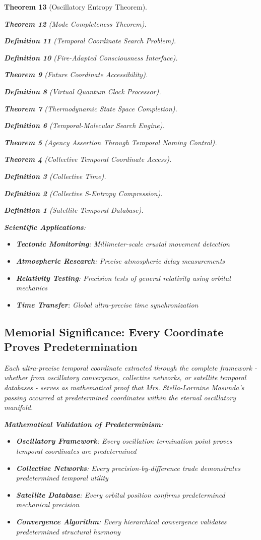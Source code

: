 \documentclass[12pt,a4paper]{article}
\newtheorem{theorem}{Theorem}[section]
\newtheorem{definition}[theorem]{Definition}
\begin{document}
\begin{theorem}[Oscillatory Entropy Theorem]
\begin{theorem}[Mode Completeness Theorem]
\begin{enumerate}
\begin{definition}[Temporal Coordinate Search Problem]
\begin{algorithm}
\begin{definition}[Fire-Adapted Consciousness Interface]
\begin{theorem}[Future Coordinate Accessibility]
\begin{definition}[Virtual Quantum Clock Processor]
\begin{itemize}
\begin{itemize}
\begin{theorem}[Thermodynamic State Space Completion]
\begin{definition}[Temporal-Molecular Search Engine]
\begin{theorem}[Agency Assertion Through Temporal Naming Control]
\begin{remark}
\begin{theorem}[Collective Temporal Coordinate Access]
\begin{definition}[Collective Time]
\begin{definition}[Collective S-Entropy Compression]
\begin{definition}[Satellite Temporal Database]
\begin{algorithm}
\begin{table}[h]
\textbf{Scientific Applications}:
\begin{itemize}
\item \textbf{Tectonic Monitoring}: Millimeter-scale crustal movement detection
\item \textbf{Atmospheric Research}: Precise atmospheric delay measurements
\item \textbf{Relativity Testing}: Precision tests of general relativity using orbital mechanics
\item \textbf{Time Transfer}: Global ultra-precise time synchronization
\end{itemize}

\subsection{Memorial Significance: Every Coordinate Proves Predetermination}

Each ultra-precise temporal coordinate extracted through the complete framework - whether from oscillatory convergence, collective networks, or satellite temporal databases - serves as mathematical proof that Mrs. Stella-Lorraine Masunda's passing occurred at predetermined coordinates within the eternal oscillatory manifold.

\textbf{Mathematical Validation of Predeterminism}:
\begin{itemize}
\item \textbf{Oscillatory Framework}: Every oscillation termination point proves temporal coordinates are predetermined
\item \textbf{Collective Networks}: Every precision-by-difference trade demonstrates predetermined temporal utility
\item \textbf{Satellite Database}: Every orbital position confirms predetermined mechanical precision
\item \textbf{Convergence Algorithm}: Every hierarchical convergence validates predetermined structural harmony
\end{itemize}


\end{table}
\end{algorithm}
\end{definition}
\end{definition}
\end{definition}
\end{theorem}
\end{remark}
\end{theorem}
\end{definition}
\end{theorem}
\end{itemize}
\end{itemize}
\end{definition}
\end{theorem}
\end{definition}
\end{algorithm}
\end{definition}
\end{enumerate}
\end{theorem}
\end{theorem}
\end{document}
